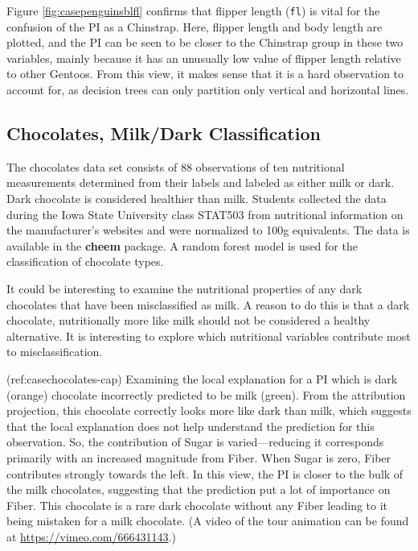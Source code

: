\documentclass[
]{jss}
\begin{document}
Figure \ref{fig:casepenguinsblfl} confirms that flipper length
(\texttt{fl}) is vital for the confusion of the PI as a Chinstrap. Here,
flipper length and body length are plotted, and the PI can be seen to be
closer to the Chinstrap group in these two variables, mainly because it
has an unusually low value of flipper length relative to other Gentoos.
From this view, it makes sense that it is a hard observation to account
for, as decision trees can only partition only vertical and horizontal
lines.

\hypertarget{chocolates-milkdark-classification}{%
\subsection{Chocolates, Milk/Dark
Classification}\label{chocolates-milkdark-classification}}

The chocolates data set consists of 88 observations of ten nutritional
measurements determined from their labels and labeled as either milk or
dark. Dark chocolate is considered healthier than milk. Students
collected the data during the Iowa State University class STAT503 from
nutritional information on the manufacturer's websites and were
normalized to 100g equivalents. The data is available in the
\textbf{cheem} package. A random forest model is used for the
classification of chocolate types.

It could be interesting to examine the nutritional properties of any
dark chocolates that have been misclassified as milk. A reason to do
this is that a dark chocolate, nutritionally more like milk should not
be considered a healthy alternative. It is interesting to explore which
nutritional variables contribute most to misclassification.

(ref:casechocolates-cap) Examining the local explanation for a PI which
is dark (orange) chocolate incorrectly predicted to be milk (green).
From the attribution projection, this chocolate correctly looks more
like dark than milk, which suggests that the local explanation does not
help understand the prediction for this observation. So, the
contribution of Sugar is varied---reducing it corresponds primarily with
an increased magnitude from Fiber. When Sugar is zero, Fiber contributes
strongly towards the left. In this view, the PI is closer to the bulk of
the milk chocolates, suggesting that the prediction put a lot of
importance on Fiber. This chocolate is a rare dark chocolate without any
Fiber leading to it being mistaken for a milk chocolate. (A video of the
tour animation can be found at \url{https://vimeo.com/666431143}.)
\end{document}
